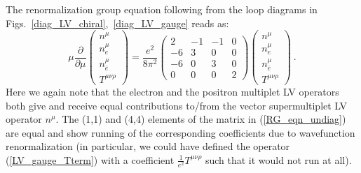 \documentclass[a4paper,12pt]{article}
\begin{document}
	The renormalization group equation following from the loop diagrams 
	in
Figs.~\ref{diag_LV_chiral},~\ref{diag_LV_gauge}
	reads as:
\begin{equation}
\label{RG_eqn_undiag}
     \mu \frac{\partial}
              {\partial\mu} 
                \left(
		\begin{array}{c}
                   n^\mu \\ 
		   n_e^\mu \\
                   n_{\bar{e}}^\mu \\
		   T^{\mu\nu\rho}
                \end{array} \right) = 
     \frac{e^2}
          {8 \pi^2} 
     \left(\begin{array}{rrrr}
                    2 & -1 & -1 & 0 \\
		   -6 &  3 &  0 & 0 \\
                   -6 &  0 &  3 & 0 \\
		    0 &  0 &  0 & 2
           \end{array}\right)
     \left(
	  \begin{array}{c}
                 n^\mu \\ 
		 n_e^\mu \\
                 n_{\bar{e}}^\mu \\
		 T^{\mu\nu\rho}
          \end{array} \right)~.
\end{equation}
	Here we again note that the electron and the positron
	multiplet LV operators both give and receive equal 
	contributions to/from the vector supermultiplet LV operator
	$ n^\mu $. 
	The (1,1) and (4,4) elements of the matrix 
	in (\ref{RG_eqn_undiag}) are equal and
	show running of the corresponding coefficients due to
	wavefunction renormalization 
	(in particular, we could have defined the operator
	(\ref{LV_gauge_Tterm}) with a coefficient 
	$ \frac{1}{e^2} T^{\mu\nu\rho} $
	such that it would not run at all).
\end{document}
